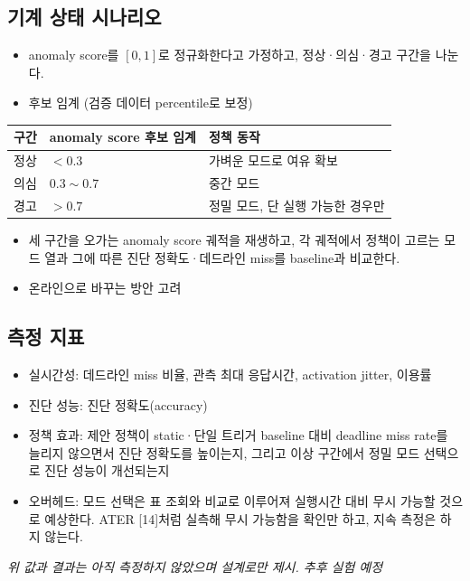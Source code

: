 \documentclass[10pt]{article}
\begin{document}
\subsection{기계 상태 시나리오}
\begin{itemize}
\item anomaly score를 $[0, 1]$로 정규화한다고 가정하고, 정상·의심·경고 구간을 나눈다.
\item 후보 임계 (검증 데이터 percentile로 보정)
\end{itemize}
\begin{center}\footnotesize
\begin{tabular}{@{}lL{4cm}L{6cm}@{}}
\toprule
구간 & anomaly score 후보 임계 & 정책 동작 \\ \midrule
정상 & $< 0.3$ & 가벼운 모드로 여유 확보 \\
의심 & $0.3 \sim 0.7$ & 중간 모드 \\
경고 & $> 0.7$ & 정밀 모드, 단 실행 가능한 경우만 \\
\bottomrule
\end{tabular}
\end{center}
\begin{itemize}
\item 세 구간을 오가는 anomaly score 궤적을 재생하고, 각 궤적에서 정책이 고르는 모드 열과 그에 따른 진단 정확도·데드라인 miss를 baseline과 비교한다.
\item 온라인으로 바꾸는 방안 고려
\end{itemize}

\subsection{측정 지표}
\begin{itemize}
\item 실시간성: 데드라인 miss 비율, 관측 최대 응답시간, activation jitter, 이용률
\item 진단 성능: 진단 정확도(accuracy)
\item 정책 효과: 제안 정책이 static·단일 트리거 baseline 대비 deadline miss rate를 늘리지 않으면서 진단 정확도를 높이는지, 그리고 이상 구간에서 정밀 모드 선택으로 진단 성능이 개선되는지
\item 오버헤드: 모드 선택은 표 조회와 비교로 이루어져 실행시간 대비 무시 가능할 것으로 예상한다. ATER [14]처럼 실측해 무시 가능함을 확인만 하고, 지속 측정은 하지 않는다.
\end{itemize}
\noindent\emph{위 값과 결과는 아직 측정하지 않았으며 설계로만 제시. 추후 실험 예정}
\end{document}

